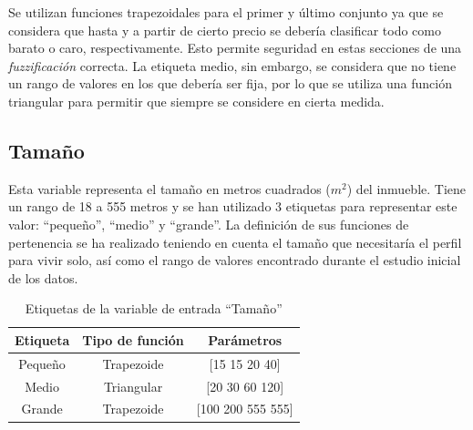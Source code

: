 \documentclass[12pt]{report} %
\begin{document}
        Se utilizan funciones trapezoidales para el primer y último conjunto ya que se considera que hasta y a partir de 
        cierto precio se debería clasificar todo como barato o caro, respectivamente. Esto permite seguridad en 
        estas secciones de una \textit{fuzzificación} correcta. La etiqueta medio, sin embargo, se considera que no tiene
        un rango de valores en los que debería ser fija, por lo que se utiliza una función triangular para permitir que 
        siempre se considere en cierta medida. 

        \subsection{Tamaño}
        Esta variable representa el tamaño en metros cuadrados ($m^2$) del inmueble.
        Tiene un rango de 18 a 555 metros y se han utilizado 3 etiquetas para representar este valor: ``pequeño'', ``medio'' y ``grande''.
        La definición de sus funciones de pertenencia se ha realizado teniendo en cuenta el tamaño que necesitaría el perfil para vivir solo,
         así como el rango de valores encontrado durante el estudio inicial de los datos.

        \begin{table}[h]
            \center
            \begin{tabular}{@{}ccc@{}}
                \toprule
                \textbf{Etiqueta} & \textbf{Tipo de función} & \textbf{Parámetros} \\
                \midrule
                Pequeño & Trapezoide & [15 15 20 40]     \\
                Medio   & Triangular & [20 30 60 120]    \\
                Grande  & Trapezoide & [100 200 555 555] \\
                \bottomrule
            \end{tabular}
            \caption{Etiquetas de la variable de entrada ``Tamaño''}
        \end{table}
\end{document}
